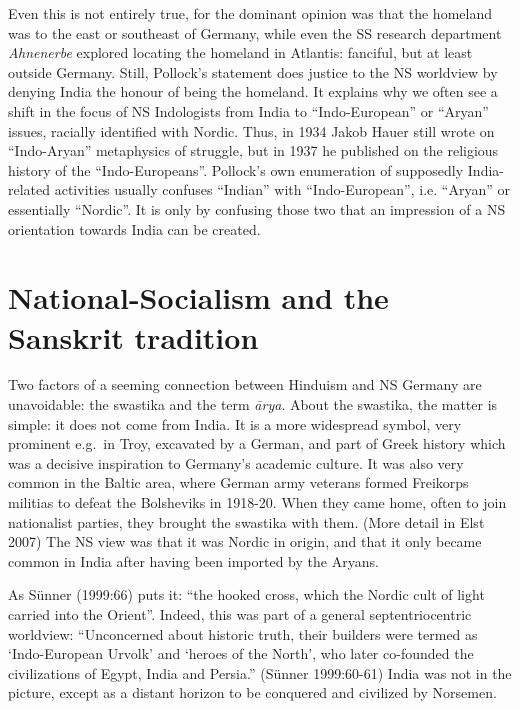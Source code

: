 Even this is not entirely true, for the dominant opinion was that the homeland was to the east or southeast of Germany, while even the SS research department {\sl Ahnenerbe} explored locating the homeland in Atlantis: fanciful, but at least outside Germany. Still, Pollock’s statement does justice to the NS worldview by denying India the honour of being the homeland. It explains why we often see a shift in the focus of NS Indologists from India to “Indo-European” or “Aryan” issues, racially identified with Nordic. Thus, in 1934 Jakob Hauer still wrote on “Indo-Aryan” metaphysics of struggle, but in 1937 he published on the religious history of the “Indo-Europeans”. Pollock’s own enumeration of supposedly India-related activities usually confuses “Indian” with “Indo-European”, i.e. “Aryan” or essentially “Nordic”. It is only by confusing those two that an impression of a NS orientation towards India can be created.

\section*{National-Socialism and the Sanskrit tradition}

Two factors of a seeming connection between Hinduism and NS Germany are unavoidable: the swastika and the term {\sl ārya}. About the swastika, the matter is simple: it does not come from India. It is a more widespread symbol, very prominent e.g.\ in Troy, excavated by a German, and part of Greek history which was a decisive inspiration to Germany’s academic culture. It was also very common in the Baltic area, where German army veterans formed Freikorps militias to defeat the Bolsheviks in 1918-20. When they came home, often to join nationalist parties, they brought the swastika with them.  (More detail in Elst 2007) The NS view was that it was Nordic in origin, and that it only became common in India after having been imported by the Aryans.

As Sünner (1999:66) puts it: “the hooked cross, which the Nordic cult of light carried into the Orient”. Indeed, this was part of a general septentriocentric worldview: “Unconcerned about historic truth, their builders were termed as ‘Indo-European Urvolk’ and ‘heroes of the North’, who later co-founded the civilizations of Egypt, India and Persia.” (Sünner 1999:60-61) India was not in the picture, except as a distant horizon to be conquered and civilized by Norsemen.

